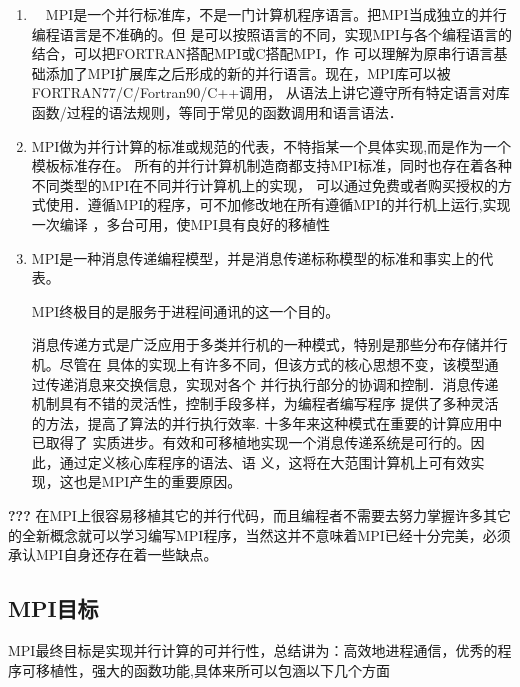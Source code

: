 \begin{enumerate}
\item　MPI是一个并行标准库，不是一门计算机程序语言。把MPI当成独立的并行编程语言是不准确的。但
是可以按照语言的不同，实现MPI与各个编程语言的结合，可以把FORTRAN搭配MPI或C搭配MPI，作
可以理解为原串行语言基础添加了MPI扩展库之后形成的新的并行语言。现在，MPI库可以被FORTRAN77/C/Fortran90/C++调用，
从语法上讲它遵守所有特定语言对库函数/过程的语法规则，等同于常见的函数调用和语言语法．
\item MPI做为并行计算的标准或规范的代表，不特指某一个具体实现,而是作为一个模板标准存在。
所有的并行计算机制造商都支持MPI标准，同时也存在着各种不同类型的MPI在不同并行计算机上的实现，
可以通过免费或者购买授权的方式使用．遵循MPI的程序，可不加修改地在所有遵循MPI的并行机上运行,实现一次编译
，多台可用，使MPI具有良好的移植性
\item MPI是一种消息传递编程模型，并是消息传递标称模型的标准和事实上的代表。

MPI终极目的是服务于进程间通讯的这一个目的。

消息传递方式是广泛应用于多类并行机的一种模式，特别是那些分布存储并行机。尽管在
具体的实现上有许多不同，但该方式的核心思想不变，该模型通过传递消息来交换信息，实现对各个
并行执行部分的协调和控制．消息传递机制具有不错的灵活性，控制手段多样，为编程者编写程序
提供了多种灵活的方法，提高了算法的并行执行效率.  十多年来这种模式在重要的计算应用中已取得了
实质进步。有效和可移植地实现一个消息传递系统是可行的。因此，通过定义核心库程序的语法、语
义，这将在大范围计算机上可有效实现，这也是MPI产生的重要原因。
\end{enumerate}

\textbf{???} 在MPI上很容易移植其它的并行代码，而且编程者不需要去努力掌握许多其它的全新概念就可以学习编写MPI程序，当然这并不意味着MPI已经十分完美，必须承认MPI自身还存在着一些缺点。

\subsection{MPI目标}
MPI最终目标是实现并行计算的可并行性，总结讲为：高效地进程通信，优秀的程序可移植性，强大的函数功能,具体来所可以包涵以下几个方面

